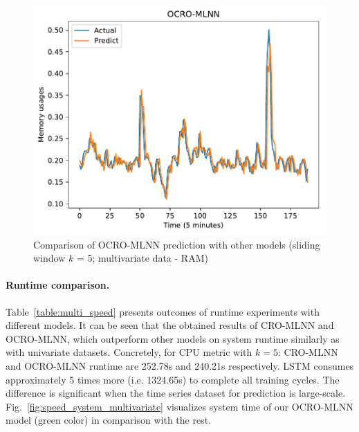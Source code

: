 \documentclass[11pt,twoside]{article}
\begin{document}
\begin{multicols}{2}
\begin{figure}[!ht]
\begin{minipage}[b]{0.33\linewidth}
    \includegraphics[width=0.9\linewidth]{predict/k5/ram_k5_ocro_mlnn.pdf} 
  \end{minipage} 
  
  \caption{Comparison of OCRO-MLNN prediction with other models (sliding window $k$ = 5; multivariate data - RAM)} 
  \label{predict_ram_sliding5} 
\end{figure}

\paragraph{\textbf{Runtime comparison.}} Table~\ref{table:multi_speed} presents outcomes of runtime experiments with different models. It can be seen that the obtained results of CRO-MLNN and OCRO-MLNN, which outperform other models on system runtime similarly as with univariate datasets. Concretely, for CPU metric with $k = 5$: CRO-MLNN and OCRO-MLNN runtime are 252.78s and 240.21s respectively. LSTM consumes approximately 5 times more (i.e. 1324.65s) to complete all training cycles. The difference is significant when the time series dataset for prediction is large-scale. Fig.~\ref{fig:speed_system_multivariate} visualizes system time of our OCRO-MLNN model (green color) in comparison with the rest.



\end{multicols}
\end{document}
